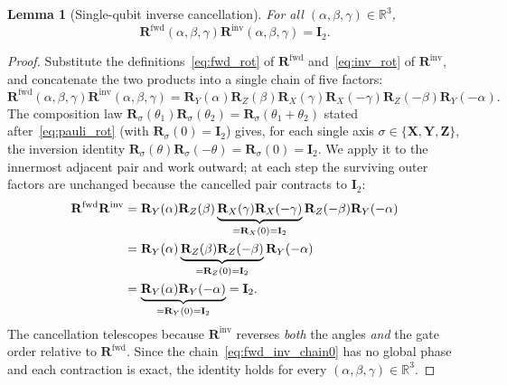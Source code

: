\documentclass[11pt]{article}
\newcommand{\bbR}{\mathbb{R}}
\newtheorem{lemma}[theorem]{Lemma}
\theoremstyle{plain}
\theoremstyle{plain}
\begin{document}
\begin{lemma}[Single-qubit inverse cancellation]
\label{lem:single_qubit_inv}
  For all $(\alpha,\beta,\gamma)\in\bbR^3$,
  \[
    \mathbf{R}^{\mathrm{fwd}}(\alpha,\beta,\gamma) 
    \mathbf{R}^{\mathrm{inv}}(\alpha,\beta,\gamma) = \mathbf{I}_2.
  \]
\end{lemma}
\begin{proof}
Substitute the definitions~\eqref{eq:fwd_rot} of
$\mathbf{R}^{\mathrm{fwd}}$ and~\eqref{eq:inv_rot} of
$\mathbf{R}^{\mathrm{inv}}$, and concatenate the two products into a single
chain of five factors:
\begin{equation}\label{eq:fwd_inv_chain0}
  \mathbf{R}^{\mathrm{fwd}}(\alpha,\beta,\gamma) 
  \mathbf{R}^{\mathrm{inv}}(\alpha,\beta,\gamma)
  = \mathbf{R}_Y(\alpha) \mathbf{R}_Z(\beta) 
    \mathbf{R}_X(\gamma) \mathbf{R}_X(-\gamma) 
    \mathbf{R}_Z(-\beta) \mathbf{R}_Y(-\alpha).
\end{equation}
The composition law $\mathbf{R}_{\sigma}(\theta_1)\mathbf{R}_{\sigma}(\theta_2)
=\mathbf{R}_{\sigma}(\theta_1+\theta_2)$ stated
after~\eqref{eq:pauli_rot} (with $\mathbf{R}_{\sigma}(0)=\mathbf{I}_2$) gives, for
each single axis $\sigma\in\{\mathbf{X},\mathbf{Y},\mathbf{Z}\}$, the inversion identity
$\mathbf{R}_{\sigma}(\theta)\mathbf{R}_{\sigma}(-\theta)
=\mathbf{R}_{\sigma}(0)=\mathbf{I}_2$. We apply it to the innermost adjacent pair
and work outward; at each step the surviving outer factors are
unchanged because the cancelled pair contracts to $\mathbf{I}_2$:
\begin{align}
  \mathbf{R}^{\mathrm{fwd}} \mathbf{R}^{\mathrm{inv}}
  &= \mathbf{R}_Y(\alpha) \mathbf{R}_Z(\beta) 
     \underbrace{\mathbf{R}_X(\gamma) \mathbf{R}_X(-\gamma)}_{= \mathbf{R}_X(0)=\mathbf{I}_2} 
     \mathbf{R}_Z(-\beta) \mathbf{R}_Y(-\alpha) \notag\\
  &= \mathbf{R}_Y(\alpha) 
     \underbrace{\mathbf{R}_Z(\beta) \mathbf{R}_Z(-\beta)}_{= \mathbf{R}_Z(0)=\mathbf{I}_2} 
     \mathbf{R}_Y(-\alpha) \notag\\
  &= \underbrace{\mathbf{R}_Y(\alpha) \mathbf{R}_Y(-\alpha)}_{= \mathbf{R}_Y(0)=\mathbf{I}_2}
   = \mathbf{I}_2. \label{eq:fwd_inv_chain}
\end{align}
The cancellation telescopes because $\mathbf{R}^{\mathrm{inv}}$ reverses
\emph{both} the angles \emph{and} the gate order relative to
$\mathbf{R}^{\mathrm{fwd}}$. Since the chain~\eqref{eq:fwd_inv_chain0} has no global
phase and each contraction is exact, the identity holds for every
$(\alpha,\beta,\gamma)\in\bbR^3$.
\end{proof}
\end{document}
